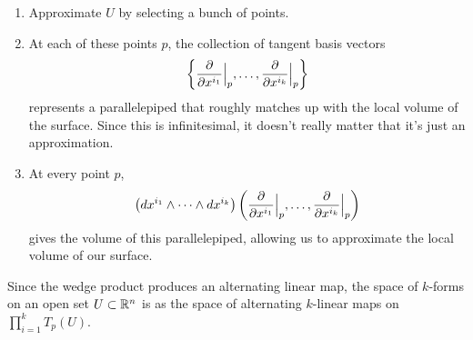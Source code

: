 \documentclass[twoside,10pt]{report}
\begin{document}
\begin{enumerate}
	\item Approximate $U$ by selecting a bunch of points.
	\item At each of these points $p$, the collection of tangent basis vectors
		\[
			\left\{ \frac{\partial}{\partial x^{i_1}} \Big|_p, \dots, \frac{\partial}{\partial x^{i_k}} \Big|_p \right\}
		\] represents a parallelepiped that roughly matches up with the local volume of the surface. Since this is infinitesimal, it doesn't really matter that it's just an approximation.
	\item At every point $p$, 
		\[
			\left( dx^{i_1} \wedge \cdots \wedge dx^{i_k} \right)\left( \frac{\partial}{\partial x^{i_1}} \Big|_p, \dots, \frac{\partial}{\partial x^{i_k}} \Big|_p \right)
		\] gives the volume of this parallelepiped, allowing us to approximate the local volume of our surface.
\end{enumerate}



Since the wedge product produces an alternating linear map, the space of $k$-forms on an open set $U \subset \mathbb{R}^{n}$ is  as the space of alternating $k$-linear maps on $\prod_{i=1}^{k} T_{p}(U)$.

\end{document}

